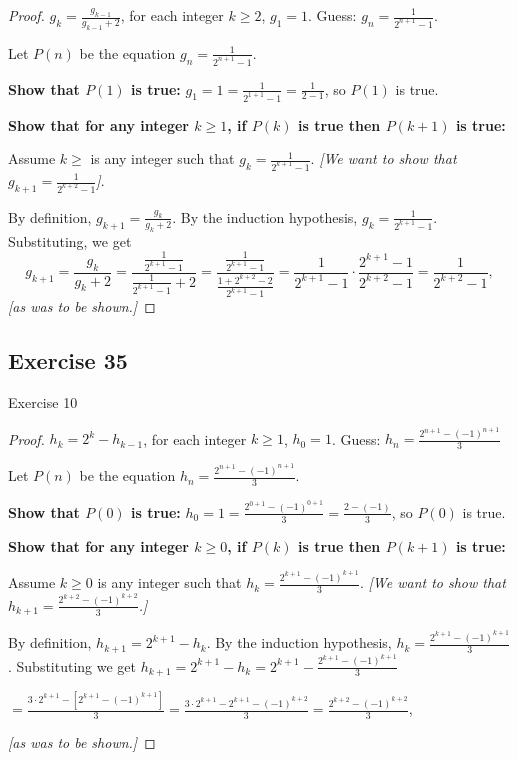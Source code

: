 \documentclass[14pt]{extarticle}
\newcommand{\dps}{\displaystyle}
\begin{document}
\begin{proof}
\(g_k = \dps \frac{g_{k-1}}{g_{k-1} + 2}\), for each integer \(k \geq 2\), \(g_1 = 1\). 
Guess: \(\dps g_n = \frac{1}{2^{n+1} - 1}\).

Let $P(n)$ be the equation \(\dps g_n = \frac{1}{2^{n+1} - 1}\).

{\bf Show that \(P(1)\) is true:} \(\dps g_1 = 1 = \frac{1}{2^{1+1} - 1} = \frac{1}{2-1}\), so $P(1)$ is true.

{\bf Show that for any integer \(k \geq 1\), if \(P(k)\) is true then \(P(k+1)\) is true:}

Assume \(k \geq \) is any integer such that \(\dps g_k = \frac{1}{2^{k+1} - 1}\). 
{\it [We want to show that \(\dps g_{k+1} = \frac{1}{2^{k+2} - 1}\)]}.

By definition, \(g_{k+1} = \dps \frac{g_k}{g_k + 2}\).
By the induction hypothesis, \(\dps g_k = \frac{1}{2^{k+1} - 1}\).
Substituting, we get
\[
g_{k+1} = \frac{g_k}{g_k + 2} = \frac{\frac{1}{2^{k+1} - 1}}{\frac{1}{2^{k+1} - 1} + 2} 
= \frac{\frac{1}{2^{k+1} - 1}}{\frac{1 + 2^{k+2} - 2}{2^{k+1} - 1}}
= \frac{1}{2^{k+1} - 1} \cdot \frac{2^{k+1} - 1}{2^{k+2} - 1} = \frac{1}{2^{k+2} - 1},
\]
{\it [as was to be shown.]}
\end{proof}

\subsection{Exercise 35}
Exercise 10

\begin{proof}
\(h_k = 2^k - h_{k-1}\), for each integer \(k \geq 1\), \(h_0 = 1\). 
Guess: \(\dps h_n = \frac{2^{n+1} - (-1)^{n+1}}{3}\)

Let $P(n)$ be the equation \(\dps h_n = \frac{2^{n+1} - (-1)^{n+1}}{3}\).

{\bf Show that \(P(0)\) is true:} \(h_0 = 1 = \frac{2^{0+1} - (-1)^{0+1}}{3} = \frac{2 -(-1)}{3}\), so $P(0)$ is true.

{\bf Show that for any integer \(k \geq 0\), if \(P(k)\) is true then \(P(k+1)\) is true:}

Assume \(k \geq 0\) is any integer such that \(\dps h_k = \frac{2^{k+1} - (-1)^{k+1}}{3}\). 
{\it [We want to show that \(\dps h_{k+1} = \frac{2^{k+2} - (-1)^{k+2}}{3}\).]}

By definition, \(h_{k+1} = 2^{k+1} - h_k\).
By the induction hypothesis, \(\dps h_k = \frac{2^{k+1} - (-1)^{k+1}}{3}\).
Substituting we get \(h_{k+1} = 2^{k+1} - h_k = \dps 2^{k+1} - \frac{2^{k+1} - (-1)^{k+1}}{3}\)

\(\dps = \frac{3 \cdot 2^{k+1} - [2^{k+1} - (-1)^{k+1}]}{3} =  \frac{3 \cdot 2^{k+1} - 2^{k+1} - (-1)^{k+2}}{3} = 
\frac{2^{k+2} - (-1)^{k+2}}{3}\), 

{\it [as was to be shown.]}
\end{proof}
\end{document}
